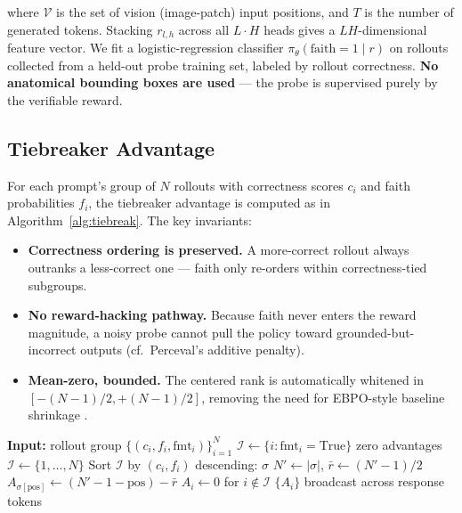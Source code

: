 \documentclass[11pt]{article}
\begin{document}
where $\mathcal{V}$ is the set of vision (image-patch) input positions,
and $T$ is the number of generated tokens. Stacking $r_{l,h}$ across all
$L \cdot H$ heads gives a $LH$-dimensional feature vector. We fit a
logistic-regression classifier $\pi_\theta(\text{faith} = 1 \mid r)$ on
rollouts collected from a held-out probe training set, labeled by rollout
correctness. \textbf{No anatomical bounding boxes are used} --- the probe
is supervised purely by the verifiable reward.

\subsection{Tiebreaker Advantage}

For each prompt's group of $N$ rollouts with correctness scores $c_i$ and
faith probabilities $f_i$, the tiebreaker advantage is computed as in
Algorithm~\ref{alg:tiebreak}. The key invariants:

\begin{itemize}
\itemsep0em
\item \textbf{Correctness ordering is preserved.} A more-correct rollout
  always outranks a less-correct one --- faith only re-orders within
  correctness-tied subgroups.
\item \textbf{No reward-hacking pathway.} Because faith never enters the
  reward magnitude, a noisy probe cannot pull the policy toward
  grounded-but-incorrect outputs (cf.\ Perceval's additive penalty).
\item \textbf{Mean-zero, bounded.} The centered rank is automatically
  whitened in $[-(N-1)/2, +(N-1)/2]$, removing the need for EBPO-style
  baseline shrinkage \citep{ebpo}.
\end{itemize}

\begin{algorithm}[t]
\caption{Tiebreaker advantage estimator}
\label{alg:tiebreak}
\begin{algorithmic}[1]
\State \textbf{Input:} rollout group $\{(c_i, f_i, \text{fmt}_i)\}_{i=1}^N$
  \State $\mathcal{I} \gets \{i : \text{fmt}_i = \text{True}\}$
   \Return zero advantages \EndIf
\Else
  \State $\mathcal{I} \gets \{1, \ldots, N\}$
\EndIf
\State Sort $\mathcal{I}$ by $(c_i, f_i)$ descending: $\sigma$
\State $N' \gets |\sigma|$, \quad $\bar r \gets (N' - 1)/2$
  \State $A_{\sigma[\text{pos}]} \gets (N' - 1 - \text{pos}) - \bar r$
\EndFor
\State $A_i \gets 0$ for $i \notin \mathcal{I}$
\State \Return $\{A_i\}$ broadcast across response tokens
\end{algorithmic}
\end{algorithm}
\end{document}
